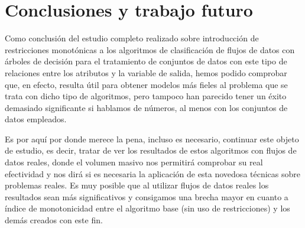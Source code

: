 \chapter[Capítulo 7. Conclusiones y trabajo futuro]{Conclusiones y trabajo futuro}

Como conclusión del estudio completo realizado sobre introducción de restricciones monotónicas a los algoritmos de clasificación de flujos de datos con árboles de decisión para el tratamiento de conjuntos de datos con este tipo de relaciones entre los atributos y la variable de salida, hemos podido comprobar que, en efecto, resulta útil para obtener modelos más fieles al problema que se trata con dicho tipo de algoritmos, pero tampoco han parecido tener un éxito demasiado significante si hablamos de números, al menos con los conjuntos de datos empleados.

Es por aquí por donde merece la pena, incluso es necesario, continuar este objeto de estudio, es decir, tratar de ver los resultados de estos algoritmos con flujos de datos reales, donde el volumen masivo nos permitirá comprobar su real efectividad y nos dirá si es necesaria la aplicación de esta novedosa técnicas sobre problemas reales. Es muy posible que al utilizar flujos de datos reales los resultados sean más significativos y consigamos una brecha mayor en cuanto a índice de monotonicidad entre el algoritmo base (sin uso de restricciones) y los demás creados con este fin.

\newpage









